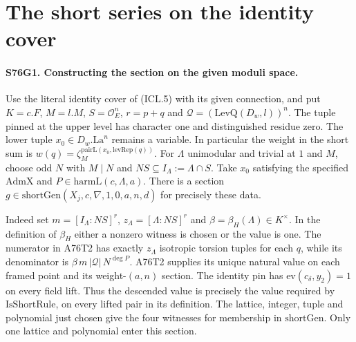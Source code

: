 \section{The short series on the identity cover}

\paragraph{S76G1. Constructing the section on the given moduli space.}
Use the literal identity cover of (ICL.5) with its given connection,
and put $K=c.F$, $M=l.M$, $S=\mathcal O_E^n$, $r=p+q$ and
$\mathcal Q=(\mathrm{LevQ}(D_w,l))^n$. The tuple pinned at the
upper level has character one and distinguished residue zero.
The lower tuple $x_0\in D_w.\mathrm{La}^n$ remains a variable.
In particular the weight in the short sum is
$w(q)=\zeta_M^{\mathrm{pairL}(x_0,\mathrm{levRep}(q))}$.
For $\Lambda$ unimodular and trivial at $1$ and $M$, choose odd $N$
with $M\mid N$ and $NS\subseteq I_\Lambda:=\Lambda\cap S$.
Take $x_0$ satisfying the specified $\mathrm{AdmX}$ and
$P\in\mathrm{harmL}(c,\Lambda,a)$. There is a section
$g\in\mathrm{shortGen}(X_j,c,\nabla,1,0,a,n,d)$ for precisely
these data.

Indeed set $m=[I_\Lambda:NS]^r$, $z_\Lambda=[\Lambda:NS]^r$ and
$\beta=\beta_H(\Lambda)\in K^\times$. In the definition of
$\beta_H$ either a nonzero witness is chosen or the value is one.
The numerator in A76T2 has exactly $z_\Lambda$ isotropic torsion
tuples for each $q$, while its denominator is
$\beta\,m\,|\mathcal Q|\,N^{\deg P}$. A76T2 supplies its unique
natural value on each framed point and its weight-$(a,n)$ section.
The identity pin has $\mathrm{ev}(c_\delta,y_2)=1$ on every field
lift. Thus the descended value is precisely the value required by
$\mathrm{IsShortRule}$, on every lifted pair in its definition.
The lattice, integer, tuple and polynomial just chosen give the
four witnesses for membership in $\mathrm{shortGen}$. Only one
lattice and polynomial enter this section.

